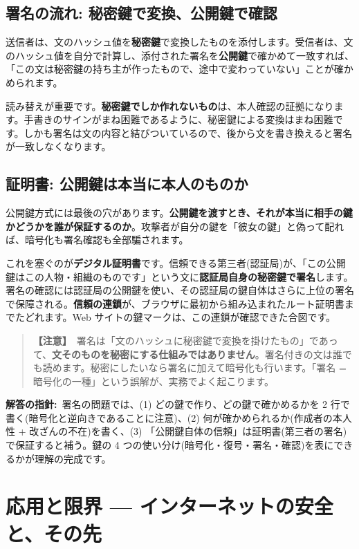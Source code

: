 \documentclass{article}
\begin{document}
\subsection{署名の流れ: 秘密鍵で変換、公開鍵で確認}

送信者は、文のハッシュ値を\textbf{秘密鍵}で変換したものを添付します。受信者は、文のハッシュ値を自分で計算し、添付された署名を\textbf{公開鍵}で確かめて一致すれば、「この文は秘密鍵の持ち主が作ったもので、途中で変わっていない」ことが確かめられます。

読み替えが重要です。\textbf{秘密鍵でしか作れないもの}は、本人確認の証拠になります。手書きのサインがまね困難であるように、秘密鍵による変換はまね困難です。しかも署名は文の内容と結びついているので、後から文を書き換えると署名が一致しなくなります。

\subsection{証明書: 公開鍵は本当に本人のものか}

公開鍵方式には最後の穴があります。\textbf{公開鍵を渡すとき、それが本当に相手の鍵かどうかを誰が保証するのか}。攻撃者が自分の鍵を「彼女の鍵」と偽って配れば、暗号化も署名確認も全部騙されます。

これを塞ぐのが\textbf{デジタル証明書}です。信頼できる第三者(認証局)が、「この公開鍵はこの人物・組織のものです」という文に\textbf{認証局自身の秘密鍵で署名}します。署名の確認には認証局の公開鍵を使い、その認証局の鍵自体はさらに上位の署名で保障される。\textbf{信頼の連鎖}が、ブラウザに最初から組み込まれたルート証明書までたどれます。Web サイトの鍵マークは、この連鎖が確認できた合図です。

\begin{quote}
\textbf{【注意】}\ 署名は「文のハッシュに秘密鍵で変換を掛けたもの」であって、\textbf{文そのものを秘密にする仕組みではありません}。署名付きの文は誰でも読めます。秘密にしたいなら署名に加えて暗号化も行います。「署名 = 暗号化の一種」という誤解が、実務でよく起こります。
\end{quote}

\textbf{解答の指針:}\ 署名の問題では、(1) どの鍵で作り、どの鍵で確かめるかを 2 行で書く(暗号化と逆向きであることに注意)、(2) 何が確かめられるか(作成者の本人性 + 改ざんの不在)を書く、(3) 「公開鍵自体の信頼」は証明書(第三者の署名)で保証すると補う。鍵の 4 つの使い分け(暗号化・復号・署名・確認)を表にできるかが理解の完成です。

\section{応用と限界 — インターネットの安全と、その先}
\end{document}
